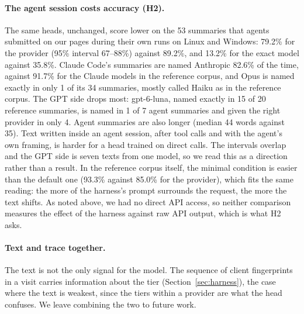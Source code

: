 \paragraph{The agent session costs accuracy (H2).} The same heads, unchanged, score lower on the 53
summaries that agents submitted on our pages during their own runs on Linux and Windows: 79.2\% for the
provider (95\% interval 67--88\%) against 89.2\%, and 13.2\% for the exact model against 35.8\%.
Claude Code's summaries are named Anthropic 82.6\% of the time, against 91.7\% for the Claude models in
the reference corpus, and Opus is named exactly in only 1 of its 34 summaries, mostly called Haiku as
in the reference corpus. The GPT side drops most: gpt-6-luna,
named exactly in 15 of 20 reference summaries, is named in 1 of 7 agent summaries and given the right
provider in only 4. Agent summaries are also longer (median 44 words against 35). Text written inside
an agent session, after tool calls and with the agent's own framing, is harder for a head trained on
direct calls. The intervals overlap and the GPT side is seven texts from one model, so we read this as
a direction rather than a result. In the reference corpus itself, the minimal condition is easier than
the default one (93.3\% against 85.0\% for the provider), which fits the same reading: the more of the
harness's prompt surrounds the request, the more the text shifts. As noted above, we had no direct API
access, so neither comparison measures the effect of the harness against raw API output, which is what
H2 asks.

\paragraph{Text and trace together.} The text is not the only signal for the model. The sequence of
client fingerprints in a visit carries information about the tier (Section~\ref{sec:harness}), the
case where the text is weakest, since the tiers within a provider are what the head confuses. We leave
combining the two to future work.
